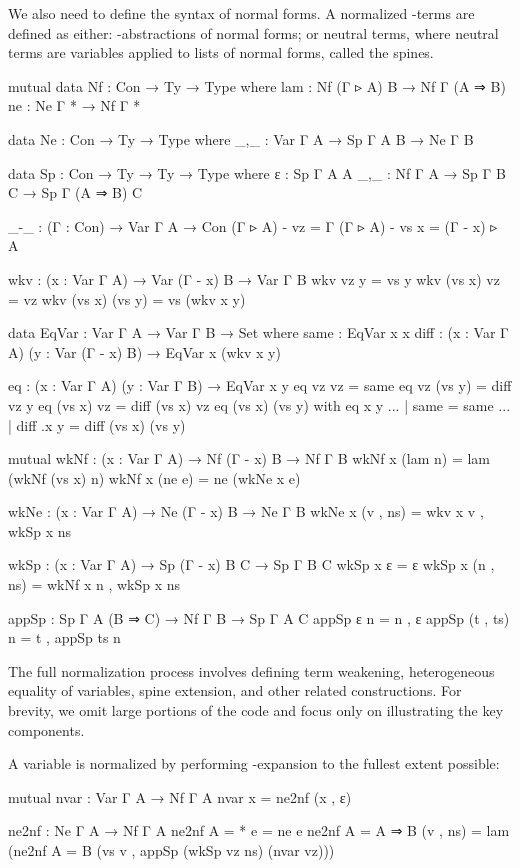 We also need to define the syntax of normal forms. A normalized \lambda-terms are defined as either: \lambda-abstractions of normal forms; or neutral terms, where neutral terms are variables applied to lists of normal forms, called the spines.

\begin{code}
mutual
  data Nf : Con → Ty → Type where
    lam : Nf (Γ ▹ A) B → Nf Γ (A ⇒ B)
    ne  : Ne Γ * → Nf Γ *

  data Ne : Con → Ty → Type where
    _,_ : Var Γ A → Sp Γ A B → Ne Γ B

  data Sp : Con → Ty → Ty → Type where
    ε   : Sp Γ A A
    _,_ : Nf Γ A → Sp Γ B C → Sp Γ (A ⇒ B) C
\end{code}

\begin{code}[hide]
_-_ : (Γ : Con) → Var Γ A → Con
(Γ ▹ A) - vz = Γ
(Γ ▹ A) - vs x = (Γ - x) ▹ A

wkv : (x : Var Γ A) → Var (Γ - x) B → Var Γ B
wkv vz y = vs y
wkv (vs x) vz = vz
wkv (vs x) (vs y) = vs (wkv x y)

data EqVar : Var Γ A → Var Γ B → Set where
  same : EqVar x x
  diff : (x : Var Γ A) (y : Var (Γ - x) B) → EqVar x (wkv x y)

eq : (x : Var Γ A) (y : Var Γ B) → EqVar x y
eq vz vz = same
eq vz (vs y) = diff vz y
eq (vs x) vz = diff (vs x) vz
eq (vs x) (vs y) with eq x y
... | same = same
... | diff .x y = diff (vs x) (vs y)

mutual
  wkNf : (x : Var Γ A) → Nf (Γ - x) B → Nf Γ B
  wkNf x (lam n) = lam (wkNf (vs x) n)
  wkNf x (ne e) = ne (wkNe x e)

  wkNe : (x : Var Γ A) → Ne (Γ - x) B → Ne Γ B
  wkNe x (v , ns) = wkv x v , wkSp x ns

  wkSp : (x : Var Γ A) → Sp (Γ - x) B C → Sp Γ B C
  wkSp x ε = ε
  wkSp x (n , ns) = wkNf x n , wkSp x ns

appSp : Sp Γ A (B ⇒ C) → Nf Γ B → Sp Γ A C
appSp ε n = n , ε
appSp (t , ts) n = t , appSp ts n
\end{code}

The full normalization process involves defining term weakening, heterogeneous equality of variables, spine extension, and other related constructions. For brevity, we omit large portions of the code and focus only on illustrating the key components.

A variable is normalized by performing \eta-expansion to the fullest extent possible:

\begin{code}
mutual
  nvar : Var Γ A → Nf Γ A
  nvar x = ne2nf (x , ε)

  ne2nf : Ne Γ A → Nf Γ A
  ne2nf {A = *} e = ne e
  ne2nf {A = A ⇒ B} (v , ns) =
    lam (ne2nf {A = B} (vs v , appSp (wkSp vz ns) (nvar vz)))
\end{code}


